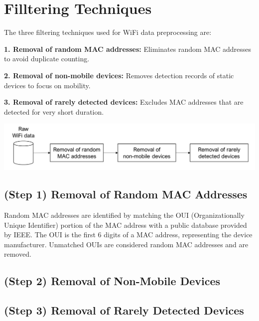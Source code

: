 \documentclass[
  letterpaper,
]{scrbook}
\begin{document}
\hypertarget{filltering-techniques}{%
\section{Filltering Techniques}\label{filltering-techniques}}

The three filtering techniques used for WiFi data preprocessing are:

\textbf{1. Removal of random MAC addresses:} Eliminates random MAC
addresses to avoid duplicate counting.

\textbf{2. Removal of non-mobile devices:} Removes detection records of
static devices to focus on mobility.

\textbf{3. Removal of rarely detected devices:} Excludes MAC addresses
that are detected for very short duration.

\includegraphics{content/material/ch3/preprocessing.png}

\hypertarget{step-1-removal-of-random-mac-addresses}{%
\subsection{(Step 1) Removal of Random MAC
Addresses}\label{step-1-removal-of-random-mac-addresses}}

Random MAC addresses are identified by matching the OUI
(Organizationally Unique Identifier) portion of the MAC address with a
public database provided by IEEE. The OUI is the first 6 digits of a MAC
address, representing the device manufacturer. Unmatched OUIs are
considered random MAC addresses and are removed.

\hypertarget{step-2-removal-of-non-mobile-devices}{%
\subsection{(Step 2) Removal of Non-Mobile
Devices}\label{step-2-removal-of-non-mobile-devices}}

\hypertarget{step-3-removal-of-rarely-detected-devices}{%
\subsection{(Step 3) Removal of Rarely Detected
Devices}\label{step-3-removal-of-rarely-detected-devices}}
\end{document}
